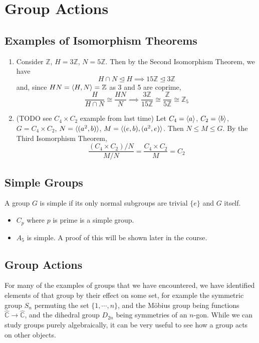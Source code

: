 \documentclass{article}
\begin{document}
\section{Group Actions}
\subsection{Examples of Isomorphism Theorems}
\begin{enumerate}
	\item Consider $\mathbb Z$, $H = 3 \mathbb Z$, $N = 5 \mathbb Z$. Then by the Second Isomorphism Theorem, we have
	      \[ H \cap N \trianglelefteq H \implies 15\mathbb Z \trianglelefteq 3\mathbb Z \]
	      and, since $HN = \langle H, N \rangle = \mathbb Z$ as 3 and 5 are coprime,
	      \[ \frac{H}{H \cap N} \cong \frac{HN}{N} \implies \frac{3\mathbb Z}{15\mathbb Z} \cong \frac{\mathbb Z}{5\mathbb Z} \cong \mathbb Z_5 \]
	\item (TODO see $C_4 \times C_2$ example from last time) Let $C_4 = \langle a \rangle$, $C_2 = \langle b \rangle$, $G = C_4 \times C_2$, $N = \langle (a^2, b) \rangle$, $M = \langle (e, b), (a^2, e) \rangle$. Then $N \leq M \leq G$. By the Third Isomorphism Theorem,
	      \[ \frac{(C_4 \times C_2) / N}{M / N} = \frac{C_4 \times C_2}{M} = C_2 \]
\end{enumerate}

\subsection{Simple Groups}
\begin{definition}
	A group $G$ is simple if its only normal subgroups are trivial $\{ e \}$ and $G$ itself.
\end{definition}
\begin{itemize}
	\item $C_p$ where $p$ is prime is a simple group.
	\item $A_5$ is simple. A proof of this will be shown later in the course.
\end{itemize}

\subsection{Group Actions}
For many of the examples of groups that we have encountered, we have identified elements of that group by their effect on some set, for example the symmetric group $S_n$ permuting the set $\{ 1, \cdots, n \}$, and the M\"obius group being functions $\hat{\mathbb C} \to \hat{\mathbb C}$, and the dihedral group $D_{2n}$ being symmetries of an $n$-gon. While we can study groups purely algebraically, it can be very useful to see how a group acts on other objects.
\end{document}

